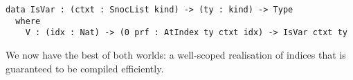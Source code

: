 \begin{Verbatim}
data IsVar : (ctxt : SnocList kind) -> (ty : kind) -> Type
  where
    V : (idx : Nat) -> (0 prf : AtIndex ty ctxt idx) -> IsVar ctxt ty
\end{Verbatim}

We now have the best of both worlds: a well-scoped realisation of \DeBruijn{} indices
that is guaranteed to be compiled efficiently.


